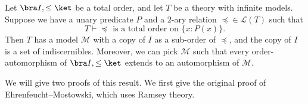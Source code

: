 \documentclass[a4paper]{article}
\begin{document}
\begin{thm}
  Let $\bra I, \leq\ket$ be a total order, and let $T$ be a theory with infinite models. Suppose we have a unary predicate $P$ and a $2$-ary relation $\preccurlyeq \in \mathcal{L}(T)$ such that
  \[
    T \vdash \text{$\preccurlyeq$ is a total order on $\{x: P(x)\}$}.
  \]
  Then $T$ has a model $\mathcal{M}$ with a copy of $I$ as a sub-order of $\preccurlyeq$, and the copy of $I$ is a set of indiscernibles. Moreover, we can pick $\mathcal{M}$ such that every order-automorphism of $\bra I, \leq \ket$ extends to an automorphism of $\mathcal{M}$.
\end{thm}

We will give two proofs of this result. We first give the original proof of Ehrenfeucht--Mostowski, which uses Ramsey theory.
\end{document}
